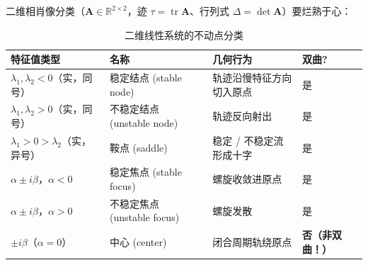 二维相肖像分类（$\mathbf{A}\in\mathbb{R}^{2\times2}$，迹 $\tau=\operatorname{tr}\mathbf{A}$、行列式 $\Delta=\det\mathbf{A}$）要烂熟于心：

\begin{table}[H]\centering\small
\caption{二维线性系统的不动点分类}
\begin{tabular}{llll}
\toprule
特征值类型 & 名称 & 几何行为 & 双曲? \\
\midrule
$\lambda_1,\lambda_2<0$（实，同号） & 稳定结点 (stable node) & 轨迹沿慢特征方向切入原点 & 是 \\
$\lambda_1,\lambda_2>0$（实，同号） & 不稳定结点 (unstable node) & 轨迹反向射出 & 是 \\
$\lambda_1>0>\lambda_2$（实，异号） & 鞍点 (saddle) & 稳定 / 不稳定流形成十字 & 是 \\
$\alpha\pm i\beta$，$\alpha<0$ & 稳定焦点 (stable focus) & 螺旋收敛进原点 & 是 \\
$\alpha\pm i\beta$，$\alpha>0$ & 不稳定焦点 (unstable focus) & 螺旋发散 & 是 \\
$\pm i\beta$（$\alpha=0$） & 中心 (center) & 闭合周期轨绕原点 & \textbf{否（非双曲！）} \\
\bottomrule
\end{tabular}
\end{table}

